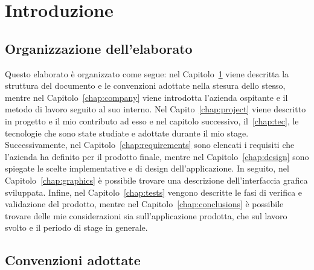 \mainmatter

\chapter{Introduzione}\label{chap:intro}

\section{Organizzazione dell'elaborato}
Questo elaborato è organizzato come segue: nel Capitolo~\ref{chap:intro} viene
descritta la struttura del documento e le convenzioni adottate nella stesura
dello stesso, mentre nel Capitolo~\ref{chap:company} viene introdotta l'azienda
ospitante e il metodo di lavoro seguito al suo interno. Nel
Capito~\ref{chap:project} viene descritto in progetto e il mio contributo ad
esso e nel capitolo successivo, il~\ref{chap:tec}, le tecnologie che sono state
studiate e adottate durante il mio stage. Successivamente, nel
Capitolo~\ref{chap:requirements} sono elencati i requisiti che l'azienda ha
definito per il prodotto finale, mentre nel Capitolo~\ref{chap:design} sono
spiegate le scelte implementative e di design dell'applicazione. In seguito, nel
Capitolo~\ref{chap:graphics} è possibile trovare una descrizione
dell'interfaccia grafica sviluppata. Infine, nel Capitolo~\ref{chap:tests}
vengono descritte le fasi di verifica e validazione del prodotto, mentre nel
Capitolo~\ref{chap:conclusions} è possibile trovare delle mie considerazioni
sia sull'applicazione prodotta, che sul lavoro svolto e il periodo di stage in
generale.

\section{Convenzioni adottate}
